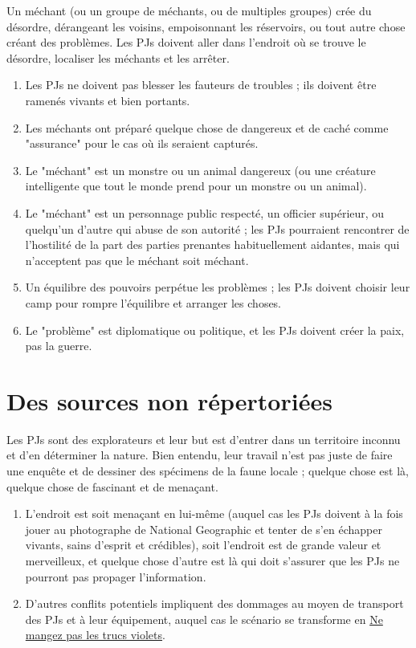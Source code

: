 \begin{multicols}{2}

Un méchant (ou un groupe de méchants, ou de multiples groupes) crée du désordre, dérangeant les voisins, empoisonnant les réservoirs, ou tout autre chose créant des problèmes. Les PJs doivent aller dans l'endroit où se trouve le désordre, localiser les méchants et les arrêter.

\themes
\begin{enumerate}
\item Les PJs ne doivent pas blesser les fauteurs de troubles ; ils doivent être ramenés vivants et bien portants.
\item Les méchants ont préparé quelque chose de dangereux et de caché comme "assurance" pour le cas où ils seraient capturés.
\item Le "méchant" est un monstre ou un animal dangereux (ou une créature intelligente que tout le monde prend pour un monstre ou un animal).
\item Le "méchant" est un personnage public respecté, un officier supérieur, ou quelqu'un d'autre qui abuse de son autorité ; les PJs pourraient rencontrer de l'hostilité de la part des parties prenantes habituellement aidantes, mais qui n'acceptent pas que le méchant soit méchant.
\item Un équilibre des pouvoirs perpétue les problèmes ; les PJs doivent choisir leur camp pour rompre l'équilibre et arranger les choses.
\item Le "problème" est diplomatique ou politique, et les PJs doivent créer la paix, pas la guerre.
\end{enumerate}

\section{Des sources non répertoriées}
\hypertarget{sources}{}


Les PJs sont des explorateurs et leur but est d'entrer dans un territoire inconnu et d'en déterminer la nature. Bien entendu, leur travail n'est pas juste de faire une enquête et de dessiner des spécimens de la faune locale ; quelque chose est là, quelque chose de fascinant et de menaçant.

\themes
\begin{enumerate}
\item L'endroit est soit menaçant en lui-même (auquel cas les PJs doivent à la fois jouer au photographe de National Geographic et tenter de s'en échapper vivants, sains d'esprit et crédibles), soit l'endroit est de grande valeur et merveilleux, et quelque chose d'autre est là qui doit s'assurer que les PJs ne pourront pas propager l'information.
\item D'autres conflits potentiels impliquent des dommages au moyen de transport des PJs et à leur équipement, auquel cas le scénario se transforme en \hyperlink{violetiolet}{Ne mangez pas les trucs violets}.
\end{enumerate}


\end{multicols}
